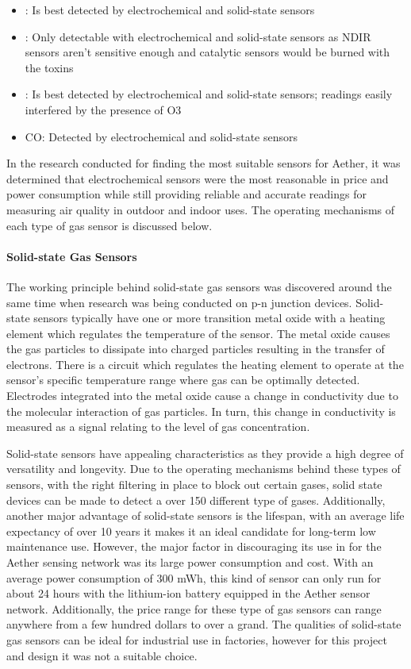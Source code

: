 \begin{itemize}
    \item \ozone: Is best detected by electrochemical and solid-state sensors
    \item \sdo: Only detectable with electrochemical and solid-state sensors as NDIR sensors aren’t sensitive enough and catalytic sensors would be burned with the toxins
    \item \nox : Is best detected by electrochemical and solid-state sensors; readings easily interfered by the presence of O3 
    \item CO: Detected by electrochemical and solid-state sensors
\end{itemize}
In the research conducted for finding the most suitable sensors for Aether, it was determined that electrochemical sensors were the most reasonable in price and power consumption while still providing reliable and accurate readings for measuring air quality in outdoor and indoor uses. The operating mechanisms of each type of gas sensor is discussed below. 

\paragraph{Solid-state Gas Sensors}
The working principle behind solid-state gas sensors was discovered around the same time when research was being conducted on p-n junction devices. Solid-state sensors typically have one or more transition metal oxide with a heating element which regulates the temperature of the sensor. The metal oxide causes the gas particles to dissipate into charged particles resulting in the transfer of electrons. There is a circuit which regulates the heating element to operate at the sensor’s specific temperature range where gas can be optimally detected. Electrodes integrated into the metal oxide cause a change in conductivity due to the molecular interaction of gas particles. In turn, this change in conductivity is measured as a signal relating to the level of gas concentration. 

Solid-state sensors have appealing characteristics as they provide a high degree of versatility and longevity. Due to the operating mechanisms behind these types of sensors, with the right filtering in place to block out certain gases, solid state devices can be made to detect a over 150 different type of gases. Additionally, another major advantage of solid-state sensors is the lifespan, with an average life expectancy of over 10 years it makes it an ideal candidate for long-term low maintenance use. However, the major factor in discouraging its use in for the Aether sensing network was its large power consumption and cost. With an average power consumption of 300 mWh, this kind of sensor can only run for about 24 hours with the lithium-ion battery equipped in the Aether sensor network. Additionally, the price range for these type of gas sensors can range anywhere from a few hundred dollars to over a grand. The qualities of solid-state gas sensors can be ideal for industrial use in factories, however for this project and design it was not a suitable choice.

